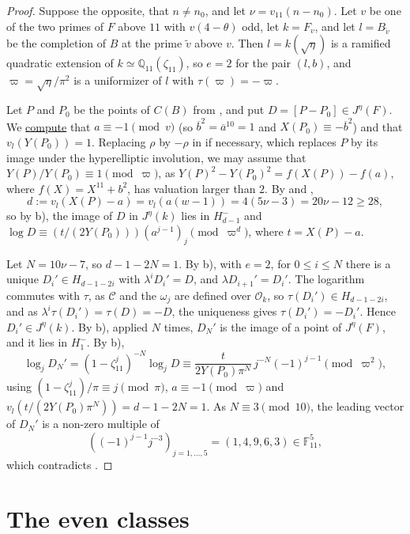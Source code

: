 \documentclass[11pt,reqno]{amsart}
\newcommand{\Q}{\mathbb{Q}}
\newcommand{\F}{\mathbb{F}}
\newcommand{\OO}{\mathcal{O}}
\newcommand{\repocommit}{c12c8c3705ed0b6b52254df69bd5ffe84542d568}
\newcommand{\gitlink}[2]{\href{https://github.com/F-Najman/Xns-121-/blob/\repocommit/#1}{#2}}
\theoremstyle{definition}
\numberwithin{equation}{section}
\begin{document}
\begin{proof}
Suppose the opposite, that $n\neq n_0$, and let $\nu=v_{11}(n-n_0)$. Let $v$ be one of the two primes of $F$ above $11$ with $v(4-\theta)$ odd, let $k=F_v$, and let $l=B_{\tilde v}$ be the completion of $B$ at the prime $\tilde v$ above $v$. Then $l=k(\sqrt\eta)$ is a ramified quadratic extension of $k\simeq\Q_{11}(\zeta_{11})$, so $e=2$ for the pair $(l,b)$, and $\varpi=\sqrt\eta/\pi^2$ is a uniformizer of $l$ with $\tau(\varpi)=-\varpi$.

Let $P$ and $P_0$ be the points of $C(B)$ from , and put $D=[P-P_0]\in J^\eta(F)$. We \gitlink{code/odd_singular_reduction.m}{compute} that $a\equiv -1\pmod v$ (so $\overline b^2=\overline a^{10}=1$ and $X(P_0)\equiv-\overline b^2$) and that $v_l(Y(P_0))=1$. Replacing $\rho$ by $-\rho$ in  if necessary, which replaces $P$ by its image under the hyperelliptic involution, we may assume that $Y(P)/Y(P_0)\equiv 1\pmod\varpi$, as $Y(P)^2-Y(P_0)^2=f(X(P))-f(a)$, where $f(X)=X^{11}+b^2$, has valuation larger than $2$. By  and ,
$$d:=v_l(X(P)-a)=v_l(a(w-1))=4(5\nu-3)=20\nu-12\geq 28,$$
so by  b), the image of $D$ in $J^\eta(k)$ lies in $H_{d-1}^-$ and $\log D\equiv (t/(2Y(P_0)))(a^{j-1})_j\pmod{\varpi^d}$, where $t=X(P)-a$.

Let $N=10\nu-7$, so $d-1-2N=1$. By  b), with $e=2$, for $0\leq i\leq N$ there is a unique $D_i'\in H_{d-1-2i}$ with $\lambda^iD_i'=D$, and $\lambda D_{i+1}'=D_i'$. The logarithm commutes with $\tau$, as $\mathcal C$ and the $\omega_j$ are defined over $\OO_k$, so $\tau(D_i')\in H_{d-1-2i}$, and as $\lambda^i\tau(D_i')=\tau(D)=-D$, the uniqueness gives $\tau(D_i')=-D_i'$. Hence $D_i'\in J^\eta(k)$. By  b), applied $N$ times, $D_N'$ is the image of a point of $J^\eta(F)$, and it lies in $H_1^-$. By  b),
$$\log_j D_N'=(1-\zeta_{11}^j)^{-N}\log_j D\equiv \frac{t}{2Y(P_0)\pi^N}\,j^{-N}(-1)^{j-1}\pmod{\varpi^2},$$
using $(1-\zeta_{11}^j)/\pi\equiv j\pmod \pi$, $a\equiv -1\pmod\varpi$ and $v_l(t/(2Y(P_0)\pi^N))=d-1-2N=1$. As $N\equiv 3\pmod{10}$, the leading vector of $D_N'$ is a non-zero multiple of
$$\left((-1)^{j-1}j^{-3}\right)_{j=1,\ldots,5}=(1,4,9,6,3)\in\F_{11}^5,$$
which contradicts .
\end{proof}

\section{The even classes}\label{sec:even}
\end{document}
